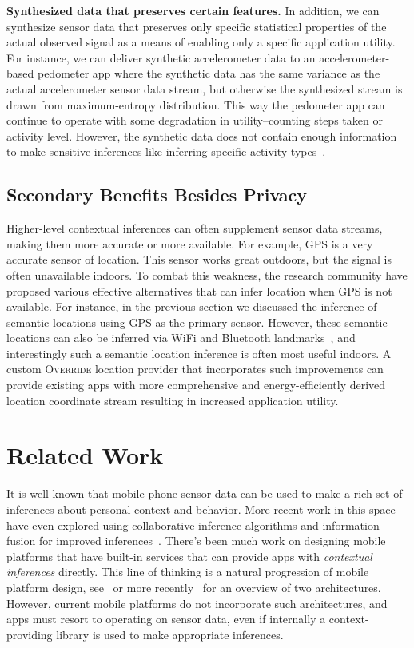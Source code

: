 \documentclass[10pt]{sensys-proc}
\begin{document}
\textbf{Synthesized data that preserves certain features.} In addition, we can synthesize sensor data that preserves only specific statistical properties of the actual observed signal as a means of enabling only a specific application utility. For instance, we can deliver synthetic accelerometer data to an accelerometer-based pedometer app where the synthetic data has the same variance as the actual accelerometer sensor data stream, but otherwise the synthesized stream is drawn from maximum-entropy distribution. This way the pedometer app can continue to operate with some degradation in utility--counting steps taken or activity level. However, the synthetic data does not contain enough information to make sensitive inferences like inferring specific activity types~\cite{Fusion}.

\subsection{Secondary Benefits Besides Privacy}
Higher-level contextual inferences can often supplement sensor data streams, making them more accurate or more available. For example, GPS is a very accurate sensor of location. This sensor works great outdoors, but the signal is often unavailable indoors. To combat this weakness, the research community have proposed various effective alternatives that can infer location when GPS is not available. For instance, in the previous section we discussed the inference of semantic locations using GPS as the primary sensor. However, these semantic locations can also be inferred via WiFi and Bluetooth landmarks~\cite{Kim:PlaceSens,Ananthanarayanan:BlueFi}, and interestingly such a semantic location inference is often most useful indoors. A custom \textsc{Override} location provider that incorporates such improvements can provide existing apps with more comprehensive and energy-efficiently derived location coordinate stream resulting in increased application utility.

\section{Related Work}
\label{Sec:related}
It is well known that mobile phone sensor data can be used to make a rich set of inferences about personal context and behavior. More recent work in this space have even explored using collaborative inference algorithms and information fusion for improved inferences~\cite{Miluzzo:DarwinPhones}. There's been much work on designing mobile platforms that have built-in services that can provide apps with \emph{contextual inferences} directly. This line of thinking is a natural progression of mobile platform design, see~\cite{Raento:ContextPhones} or more recently~\cite{Chu:CondOS} for an overview of two architectures. However, current mobile platforms do not incorporate such architectures, and apps must resort to operating on sensor data, even if internally a context-providing library is used to make appropriate inferences.
\end{document}
